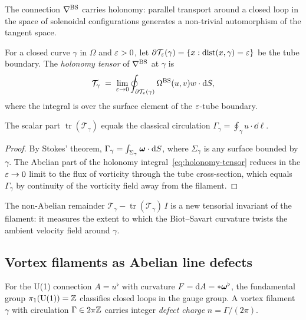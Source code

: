 The connection $\nabla^{\mathrm{BS}}$ carries holonomy: parallel transport around a closed loop
in the space of solenoidal configurations generates a non-trivial automorphism
of the tangent space.

\begin{definition}\label{def:holonomy}
  For a closed curve $\gamma$ in $\Omega$ and $\varepsilon > 0$, let
  $\partial\mathcal{T}_\varepsilon(\gamma) = \{x : \operatorname{dist}(x,\gamma) = \varepsilon\}$
  be the tube boundary.  The \emph{holonomy tensor} of $\nabla^{\mathrm{BS}}$ at $\gamma$ is
  \begin{equation}\label{eq:holonomy-tensor}
    \mathcal{T}_\gamma
    \;=\; \lim_{\varepsilon\to 0} \oint_{\partial\mathcal{T}_\varepsilon(\gamma)}
    \Omega^{\mathrm{BS}}(u,v)w\cdot \mathrm{d} S,
  \end{equation}
  where the integral is over the surface element of the $\varepsilon$-tube boundary.
\end{definition}

\begin{proposition}\label{prop:abelian-holonomy}
  The scalar part $\operatorname{tr}(\mathcal{T}_\gamma)$ equals the classical
  circulation $\Gamma_\gamma = \oint_\gamma u\cdot\dd\ell$.
\end{proposition}

\begin{proof}
  By Stokes' theorem, $\Gamma_\gamma = \int_{\Sigma_\gamma} \boldsymbol{\omega}\cdot\mathrm{d} S$,
  where $\Sigma_\gamma$ is any surface bounded by $\gamma$.  The Abelian part of the
  holonomy integral~\eqref{eq:holonomy-tensor} reduces in the $\varepsilon \to 0$ limit to
  the flux of vorticity through the tube cross-section, which equals $\Gamma_\gamma$
  by continuity of the vorticity field away from the filament.
\end{proof}

The non-Abelian remainder $\mathcal{T}_\gamma - \operatorname{tr}(\mathcal{T}_\gamma)\,I$
is a new tensorial invariant of the filament: it measures the extent to which the
Biot--Savart curvature twists the ambient velocity field around $\gamma$.

\subsection{Vortex filaments as Abelian line defects}

For the U(1) connection $A = u^\flat$ with curvature $F = \mathrm{d} A = *\boldsymbol{\omega}^\flat$,
the fundamental group $\pi_1(\mathrm{U}(1)) = \mathbb{Z}$ classifies closed loops in the
gauge group.  A vortex filament $\gamma$ with circulation $\Gamma \in 2\pi\mathbb{Z}$
carries integer \emph{defect charge} $n = \Gamma/(2\pi)$.

